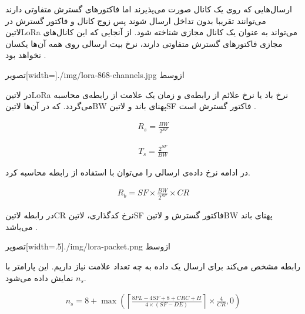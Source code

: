 ارسال‌هایی که روی یک کانال صورت می‌پذیرند اما فاکتورهای گسترش متفاوتی دارند می‌توانند تقریبا بدون تداخل ارسال شوند پس زوج کانال و فاکتور گسترش در ‌لاتین{LoRa} می‌تواند به عنوان
یک کانال مجازی شناخته شود. از آنجایی که این کانال‌های مجازی فاکتورهای گسترش متفاوتی دارند، نرخ بیت ارسالی روی همه آن‌ها یکسان نخواهد بود
.

‌تصویر[width=\textwidth]{./img/lora-868-channels.jpg}
‌ازوسط

در ‌لاتین{LoRa} نرخ باد یا نرخ علائم از رابطه‌ی 
و زمان یک علامت از رابطه‌ی 
محاسبه می‌گردد.
که در آن‌ها ‌لاتین{BW} پهنای باند و ‌لاتین{SF} فاکتور گسترش است
.

\begin{align}
  \label{معادله: نرخ باد یا علائم در LoRa}
  R_{s} = \frac{BW}{2^{SF}}
\end{align}

\begin{align}
  \label{معادله: زمان علامت در LoRa}
  T_{s} = \frac{2^{SF}}{BW}
\end{align}

در ادامه نرخ داده‌ی ارسالی را می‌توان با استفاده از رابطه  محاسبه کرد.

\begin{align}
  \label{معادله: نرخ داده در LoRa}
  R_{b} = SF \times \frac{BW}{2^{SF}} \times CR
\end{align}

در رابطه  ‌لاتین{CR} نرخ کدگذاری، ‌لاتین{SF} فاکتور گسترش و ‌لاتین{BW} پهنای باند می‌باشد
.

‌تصویر[width=.5\textwidth]{./img/lora-packet.png}
‌ازوسط

رابطه  مشخص می‌کند برای ارسال یک داده به چه تعداد علامت نیاز داریم. این پارامتر با $n_{s}$ نمایش داده می‌شود.

\begin{align}
  \label{معادله: تعداد علائم مورد نیاز در LoRa}
  n_{s} = 8 + \max\left( \left\lceil \frac{8PL - 4SF + 8 + CRC + H}{4 \times (SF - DE)} \right\rceil \times \frac{4}{CR}, 0 \right)
\end{align}

